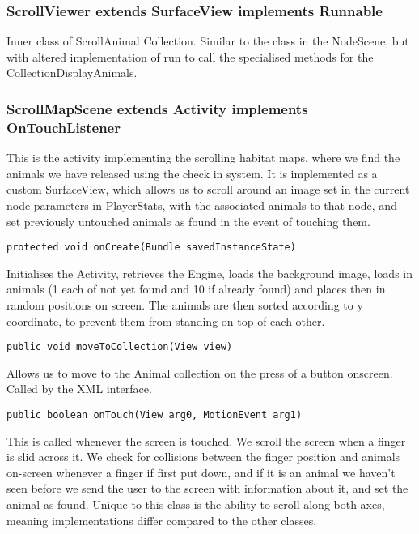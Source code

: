 \documentclass[12pt,a4paper,twoside]{article}
\begin{document}
\subsubsection{ScrollViewer extends SurfaceView implements Runnable}

Inner class of ScrollAnimal Collection. Similar to the class in the NodeScene, but with altered implementation of run to call the specialised methods for the CollectionDisplayAnimals.


\subsubsection{ScrollMapScene extends Activity implements OnTouchListener}

This is the activity implementing the scrolling habitat maps, where we find the animals we have released using the check in system. It is implemented as a custom SurfaceView, which allows us to scroll around an image set in the current node parameters in PlayerStats, with the associated animals to that node, and set previously untouched animals as found in the event of touching them.

\begin{verbatim}
protected void onCreate(Bundle savedInstanceState)
\end{verbatim}

Initialises the Activity, retrieves the Engine, loads the background image, loads in animals (1 each of not yet found and 10 if already found) and places then in random positions on screen. The animals are then sorted according to y coordinate, to prevent them from standing on top of each other.

\begin{verbatim}
public void moveToCollection(View view)
\end{verbatim}
Allows us to move to the Animal collection on the press of a button onscreen. Called by the XML interface.

\begin{verbatim}
public boolean onTouch(View arg0, MotionEvent arg1)
\end{verbatim}

This is called whenever the screen is touched. We scroll the screen when a finger is slid across it. We check for collisions between the finger position and animals on-screen whenever a finger if first put down, and if it is an animal we haven't seen before we send the user to the screen with information about it, and set the animal as found. Unique to this class is the ability to scroll along both axes, meaning implementations differ compared to the other classes.
\end{document}
